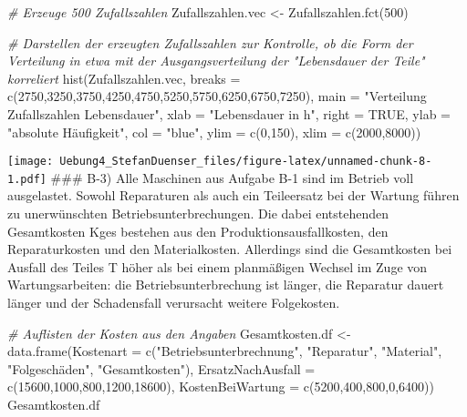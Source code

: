 \documentclass[
]{article}
\newenvironment{Shaded}{\begin{snugshade}}{\end{snugshade}}
\newcommand{\AttributeTok}[1]{\textcolor[rgb]{0.77,0.63,0.00}{#1}}
\newcommand{\CommentTok}[1]{\textcolor[rgb]{0.56,0.35,0.01}{\textit{#1}}}
\newcommand{\ConstantTok}[1]{\textcolor[rgb]{0.00,0.00,0.00}{#1}}
\newcommand{\DecValTok}[1]{\textcolor[rgb]{0.00,0.00,0.81}{#1}}
\newcommand{\FunctionTok}[1]{\textcolor[rgb]{0.00,0.00,0.00}{#1}}
\newcommand{\NormalTok}[1]{#1}
\newcommand{\OtherTok}[1]{\textcolor[rgb]{0.56,0.35,0.01}{#1}}
\newcommand{\StringTok}[1]{\textcolor[rgb]{0.31,0.60,0.02}{#1}}
\begin{document}
\begin{Shaded}
\begin{Highlighting}[]
\CommentTok{\# Erzeuge 500 Zufallszahlen}
\NormalTok{Zufallszahlen.vec }\OtherTok{\textless{}{-}} \FunctionTok{Zufallszahlen.fct}\NormalTok{(}\DecValTok{500}\NormalTok{)}
  
\CommentTok{\# Darstellen der erzeugten Zufallszahlen zur Kontrolle, ob die Form der Verteilung in etwa mit der Ausgangsverteilung der "Lebensdauer der Teile" korreliert}
\FunctionTok{hist}\NormalTok{(Zufallszahlen.vec, }\AttributeTok{breaks =} \FunctionTok{c}\NormalTok{(}\DecValTok{2750}\NormalTok{,}\DecValTok{3250}\NormalTok{,}\DecValTok{3750}\NormalTok{,}\DecValTok{4250}\NormalTok{,}\DecValTok{4750}\NormalTok{,}\DecValTok{5250}\NormalTok{,}\DecValTok{5750}\NormalTok{,}\DecValTok{6250}\NormalTok{,}\DecValTok{6750}\NormalTok{,}\DecValTok{7250}\NormalTok{), }\AttributeTok{main =} \StringTok{"Verteilung Zufallszahlen Lebensdauer"}\NormalTok{, }\AttributeTok{xlab =} \StringTok{"Lebensdauer in h"}\NormalTok{, }\AttributeTok{right =} \ConstantTok{TRUE}\NormalTok{, }\AttributeTok{ylab =} \StringTok{"absolute Häufigkeit"}\NormalTok{, }\AttributeTok{col =} \StringTok{"blue"}\NormalTok{, }\AttributeTok{ylim =} \FunctionTok{c}\NormalTok{(}\DecValTok{0}\NormalTok{,}\DecValTok{150}\NormalTok{), }\AttributeTok{xlim =} \FunctionTok{c}\NormalTok{(}\DecValTok{2000}\NormalTok{,}\DecValTok{8000}\NormalTok{))}
\end{Highlighting}
\end{Shaded}

\texttt{[image: Uebung4\_StefanDuenser\_files/figure-latex/unnamed-chunk-8-1.pdf]}
\#\#\# B-3) Alle Maschinen aus Aufgabe B-1 sind im Betrieb voll
ausgelastet. Sowohl Reparaturen als auch ein Teileersatz bei der Wartung
führen zu unerwünschten Betriebsunterbrechungen. Die dabei entstehenden
Gesamtkosten Kges bestehen aus den Produktionsausfallkosten, den
Reparaturkosten und den Materialkosten. Allerdings sind die Gesamtkosten
bei Ausfall des Teiles T höher als bei einem planmäßigen Wechsel im Zuge
von Wartungsarbeiten: die Betriebsunterbrechung ist länger, die
Reparatur dauert länger und der Schadensfall verursacht weitere
Folgekosten.

\begin{Shaded}
\begin{Highlighting}[]
\CommentTok{\# Auflisten der Kosten aus den Angaben}
\NormalTok{Gesamtkosten.df }\OtherTok{\textless{}{-}} \FunctionTok{data.frame}\NormalTok{(}\AttributeTok{Kostenart =} \FunctionTok{c}\NormalTok{(}\StringTok{"Betriebsunterbrechnung"}\NormalTok{, }\StringTok{"Reparatur"}\NormalTok{, }\StringTok{"Material"}\NormalTok{, }\StringTok{"Folgeschäden"}\NormalTok{, }\StringTok{"Gesamtkosten"}\NormalTok{), }\AttributeTok{ErsatzNachAusfall =} \FunctionTok{c}\NormalTok{(}\DecValTok{15600}\NormalTok{,}\DecValTok{1000}\NormalTok{,}\DecValTok{800}\NormalTok{,}\DecValTok{1200}\NormalTok{,}\DecValTok{18600}\NormalTok{), }\AttributeTok{KostenBeiWartung =} \FunctionTok{c}\NormalTok{(}\DecValTok{5200}\NormalTok{,}\DecValTok{400}\NormalTok{,}\DecValTok{800}\NormalTok{,}\DecValTok{0}\NormalTok{,}\DecValTok{6400}\NormalTok{))}
\NormalTok{Gesamtkosten.df}
\end{Highlighting}
\end{Shaded}
\end{document}
